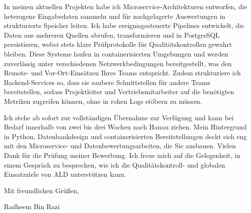 \documentclass[11pt,a4paper]{coverletter}
\begin{document}
In meinen aktuellen Projekten habe ich Microservice-Architekturen entworfen, die heterogene Eingabedaten sammeln und für nachgelagerte Auswertungen in strukturierte Speicher leiten. Ich habe ereignisgesteuerte Pipelines entwickelt, die Daten aus mehreren Quellen abrufen, transformieren und in PostgreSQL persistieren, wobei stets klare Prüfprotokolle für Qualitätskontrollen gewahrt bleiben. Diese Systeme laufen in containerisierten Umgebungen und werden zuverlässig unter verschiedenen Netzwerkbedingungen bereitgestellt, was den Remote- und Vor-Ort-Einsätzen Ihres Teams entspricht. Zudem strukturiere ich Backend-Services so, dass sie saubere Schnittstellen für andere Teams bereitstellen, sodass Projektleiter und Vertriebsmitarbeiter auf die benötigten Metriken zugreifen können, ohne in rohen Logs stöbern zu müssen.

Ich stehe ab sofort zur vollständigen Übernahme zur Verfügung und kann bei Bedarf innerhalb von zwei bis drei Wochen nach Hanau ziehen. Mein Hintergrund in Python, Datenbankdesign und containerisierten Bereitstellungen deckt sich eng mit den Microservice- und Datenbewertungsarbeiten, die Sie ausbauen. Vielen Dank für die Prüfung meiner Bewerbung. Ich freue mich auf die Gelegenheit, in einem Gespräch zu besprechen, wie ich die Qualitätskontroll- und globalen Einsatzziele von ALD unterstützen kann.

\closing{Mit freundlichen Grüßen,}{Radheem Bin Razi}
\end{document}
